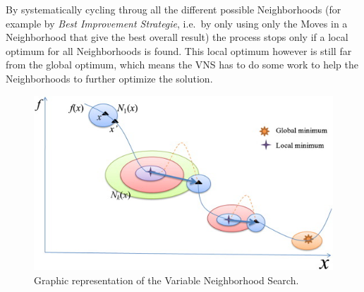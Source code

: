\documentclass[paper=a4,fontsize=12pt]{scrartcl}
\begin{document}
{%

By systematically cycling throug all the different possible Neighborhoods (for example by \emph{Best Improvement Strategie}, i.e.\ by only using only the Moves in a Neighborhood that give the best overall result) the process stops only if a local optimum for all Neighborhoods is found. This local optimum however is still far from the global optimum, which means the VNS has to do some work to help the Neighborhoods to further optimize the solution.


\begin{figure}
\begin{center}
\includegraphics{../img/vns.jpg}
\end{center}
\caption{Graphic representation of the Variable Neighborhood Search. \cite{Chen}}
\end{figure}

}
\end{document}
